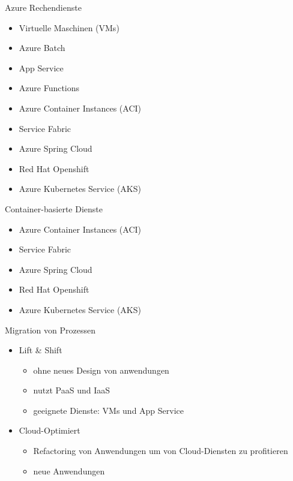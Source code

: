 

\begin{flashcard}[]{Azure Rechendienste}
  \begin{itemize}
    \item Virtuelle Maschinen (VMs)
    \item Azure Batch
    \item App Service
    \item Azure Functions
    \item Azure Container Instances (ACI)
    \item Service Fabric
    \item Azure Spring Cloud
    \item Red Hat Openshift
    \item Azure Kubernetes Service (AKS)
  \end{itemize}
\end{flashcard}

\begin{flashcard}[]{Container-basierte Dienste}
  \begin{itemize}
    \item Azure Container Instances (ACI)
    \item Service Fabric
    \item Azure Spring Cloud
    \item Red Hat Openshift
    \item Azure Kubernetes Service (AKS)
  \end{itemize}
\end{flashcard}

\begin{flashcard}[]{Migration von Prozessen}
  \begin{itemize}
    \item Lift \& Shift
      \begin{itemize}
        \item ohne neues Design von anwendungen
        \item nutzt PaaS und IaaS
        \item geeignete Dienste: VMs und App Service
      \end{itemize}
    \item Cloud-Optimiert
      \begin{itemize}
        \item Refactoring von Anwendungen um von Cloud-Diensten zu profitieren
        \item neue Anwendungen
      \end{itemize}
  \end{itemize}
\end{flashcard}


